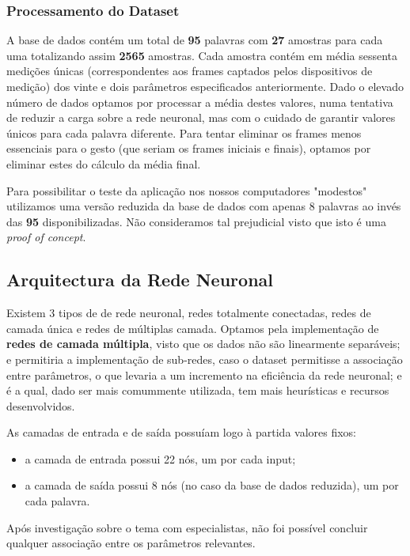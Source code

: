 \documentclass[10pt,a4paper]{article}
\begin{document}
\subsubsection{Processamento do Dataset}

A base de dados contém um total de \textbf{95} palavras com \textbf{27} amostras para cada uma totalizando assim \textbf{2565} amostras.
Cada amostra contém em média sessenta medições únicas (correspondentes aos frames captados pelos dispositivos de medição) dos vinte e dois parâmetros especificados anteriormente.
Dado o elevado número de dados optamos por processar a média destes valores, numa tentativa de reduzir a carga sobre a rede neuronal, mas com o cuidado de garantir valores únicos para cada palavra diferente. Para tentar eliminar os frames menos essenciais para o gesto (que seriam os frames iniciais e finais), optamos por eliminar estes do cálculo da média final.

Para possibilitar o teste da aplicação nos nossos computadores "modestos" utilizamos uma versão reduzida da base de dados com apenas 8 palavras ao invés das \textbf{95} disponibilizadas. Não consideramos tal prejudicial visto que isto é uma \textit{proof of concept}.

\subsection{Arquitectura da Rede Neuronal}

Existem 3 tipos de de rede neuronal, redes totalmente conectadas, redes de camada única e redes de múltiplas camada.
Optamos pela implementação de \textbf{redes de camada múltipla}, visto que os dados não são linearmente separáveis; e permitiria a implementação de sub-redes, caso o dataset permitisse a associação entre parâmetros, o que levaria a um incremento na eficiência da rede neuronal; e é a qual, dado ser mais comummente utilizada, tem mais heurísticas e recursos desenvolvidos.

As camadas de entrada e de saída possuíam logo à partida valores fixos:
\begin{itemize}
\item a camada de entrada possui 22 nós, um por cada input;
\item a camada de saída possui 8 nós (no caso da base de dados reduzida), um por cada palavra.
\end{itemize}

Após investigação sobre o tema com especialistas, não foi possível concluir qualquer associação entre os parâmetros relevantes.
\end{document}
